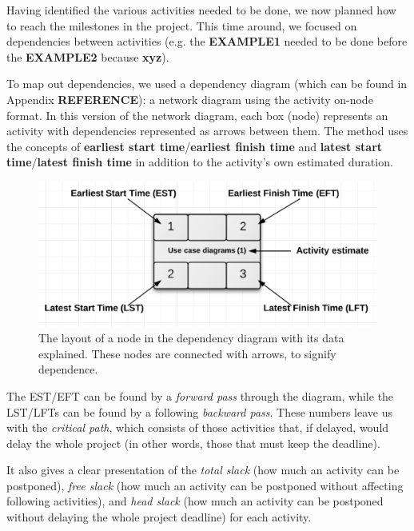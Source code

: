 Having identified the various activities needed to be done, we now planned how
to reach the milestones in the project. This time around, we focused on dependencies
between activities (e.g. the \textbf{EXAMPLE1} needed to be done before the
\textbf{EXAMPLE2} because \textbf{xyz}).

To map out dependencies, we used a dependency diagram (which can be found in Appendix
\textbf{REFERENCE}): a network diagram using the activity on-node format\cite{caye}.
In this version of the network diagram, each box (node) represents an activity with
dependencies represented as arrows between them. The method uses the concepts of
\textbf{earliest start time}/\textbf{earliest finish time} and \textbf{latest start
time}/\textbf{latest finish time} in addition to the activity’s own estimated duration.

\begin{figure}[hbtp]
    \centering
    \includegraphics[scale=0.5]{./Empiri/Planning/img/networkdiagramnotation.png}
    \caption{The layout of a node in the dependency diagram with its data explained. These nodes are connected with arrows, to signify dependence.}
\end{figure}
 
The EST/EFT can be found by a \emph{forward pass} through the diagram, while the LST/LFTs
can be found by a following \emph{backward pass}. These numbers leave us with the
\emph{critical path}, which consists of those activities that, if delayed, would delay
the whole project (in other words, those that must keep the deadline).

It also gives a clear presentation of the \emph{total slack} (how much an activity can
be postponed), \emph{free slack} (how much an activity can be postponed without affecting
following activities), and \emph{head slack} (how much an activity can be postponed without
delaying the whole project deadline) for each activity.